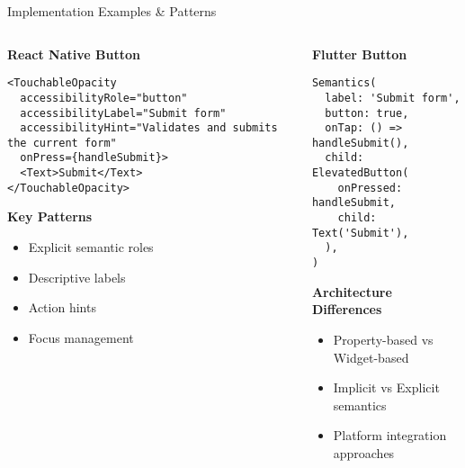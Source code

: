 \documentclass[10pt,aspectratio=169]{beamer}
\begin{document}
\begin{frame}[fragile]{Implementation Examples \& Patterns}
    \begin{columns}[t]
        \begin{column}{0.48\textwidth}
            \textbf{React Native Button}
            \begin{lstlisting}[basicstyle=\tiny\ttfamily]
<TouchableOpacity
  accessibilityRole="button"
  accessibilityLabel="Submit form"
  accessibilityHint="Validates and submits the current form"
  onPress={handleSubmit}>
  <Text>Submit</Text>
</TouchableOpacity>
            \end{lstlisting}
            
            \vspace{0.3cm}
            
            \textbf{Key Patterns}
            \begin{itemize}
                \item Explicit semantic roles
                \item Descriptive labels
                \item Action hints
                \item Focus management
            \end{itemize}
        \end{column}
        \begin{column}{0.48\textwidth}
            \textbf{Flutter Button}
            \begin{lstlisting}[basicstyle=\tiny\ttfamily]
Semantics(
  label: 'Submit form',
  button: true,
  onTap: () => handleSubmit(),
  child: ElevatedButton(
    onPressed: handleSubmit,
    child: Text('Submit'),
  ),
)
            \end{lstlisting}
            
            \vspace{0.3cm}
            
            \textbf{Architecture Differences}
            \begin{itemize}
                \item Property-based vs Widget-based
                \item Implicit vs Explicit semantics
                \item Platform integration approaches
            \end{itemize}
        \end{column}
    \end{columns}
\end{frame}
\end{document}
